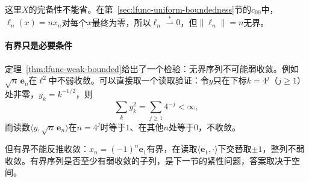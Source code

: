 这里$X$的完备性不能省。在第~\ref{sec:lfunc-uniform-boundedness}节的$c_{00}$中，$\ell_n(x)=nx_n$对每个$x$最终为零，所以$\ell_n\overset{*}{\rightharpoonup}0$，但$\lVert\ell_n\rVert=n$无界。

\paragraph{有界只是必要条件}
定理~\ref{thm:lfunc-weak-bounded}给出了一个检验：无界序列不可能弱收敛。例如$\sqrt n\,\bm e_n$在$\ell^2$中不弱收敛。可以直接取一个读取验证：令$y$只在下标$k=4^j$（$j\geq1$）处非零，$y_k=k^{-1/2}$，则
\[
\sum_k y_k^2=\sum_{j\geq1}4^{-j}<\infty ,
\]
而读数$\langle y,\sqrt n\,\bm e_n\rangle$在$n=4^j$时等于$1$、在其他$n$处等于$0$，不收敛。

但有界不能反推收敛：$x_n=(-1)^n\bm e_1$有界，在读取$\langle\bm e_1,\cdot\rangle$下交替取$\pm1$，整列不弱收敛。有界序列是否至少有弱收敛的子列，是下一节的紧性问题，答案取决于空间。
